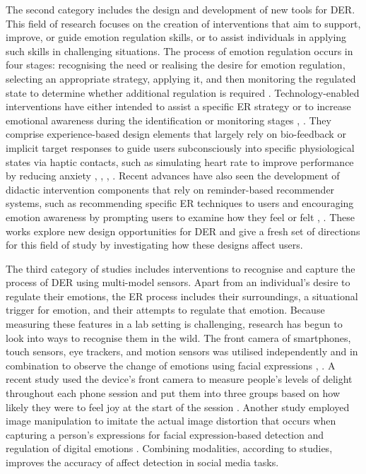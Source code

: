 \documentclass[acmtog]{acmart}
\begin{document}
The second category includes the design and development of new tools for DER. This field of research focuses on the creation of interventions that aim to support, improve, or guide emotion regulation skills, or to assist individuals in applying such skills in challenging situations. The process of emotion regulation occurs in four stages: recognising the need or realising the desire for emotion regulation, selecting an appropriate strategy, applying it, and then monitoring the regulated state to determine whether additional regulation is required \cite{wadley2020digital}. Technology-enabled interventions have either intended to assist a specific ER strategy or to increase emotional awareness during the identification or monitoring stages \cite{smith2022digital}, \cite{slovak2022designing}. They comprise experience-based design elements that largely rely on bio-feedback or implicit target responses to guide users subconsciously into specific physiological states via haptic contacts, such as simulating heart rate to improve performance by reducing anxiety \cite{miri2020evaluating}, \cite{newbold2017using}, \cite{mancini2020room}, \cite{paredes2018just}. Recent advances have also seen the development of didactic intervention components that rely on reminder-based recommender systems, such as recommending specific ER techniques to users and encouraging emotion awareness by prompting users to examine how they feel or felt \cite{chen2016promoting}, \cite{costa2019boostmeup}. These works explore new design opportunities for DER and give a fresh set of directions for this field of study by investigating how these designs affect users.

The third category of studies includes interventions to recognise and capture the process of DER using multi-model sensors. Apart from an individual's desire to regulate their emotions, the ER process includes their surroundings, a situational trigger for emotion, and their attempts to regulate that emotion. Because measuring these features in a lab setting is challenging, research has begun to look into ways to recognise them in the wild. The front camera of smartphones, touch sensors, eye trackers, and motion sensors was utilised independently and in combination to observe the change of emotions using facial expressions \cite{yang2021behavioral}, \cite{ruensuk2020you}. A recent study used the device's front camera to measure people's levels of delight throughout each phone session and put them into three groups based on how likely they were to feel joy at the start of the session \cite{tag2022emotion}. Another study employed image manipulation to imitate the actual image distortion that occurs when capturing a person's expressions for facial expression-based detection and regulation of digital emotions \cite{yang2021benchmarking}. Combining modalities, according to studies, improves the accuracy of affect detection in social media tasks.
\end{document}
